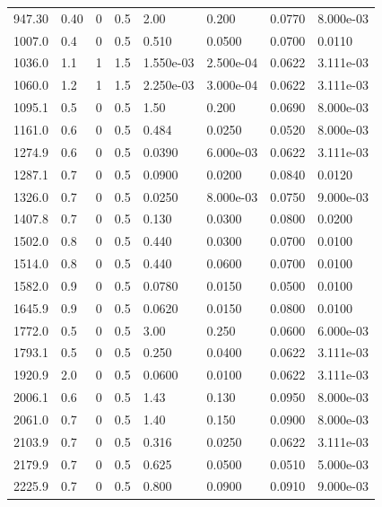 \documentclass[preview]{standalone}
\begin{document}
{{\begin{tabular}{L{1.2cm}C{1.2cm} C{0.3cm}C{0.5cm} C{1.4cm}C{1.4cm} C{1.4cm}C{1.4cm}}
  947.30  &  0.40  & 0     & 0.5 &  2.00  & 0.200  & 0.0770 &  8.000e-03   \\ 
  1007.0  &   0.4  & 0     & 0.5 &  0.510  & 0.0500  & 0.0700 &  0.0110   \\ 
  1036.0  &   1.1  & 1     & 1.5 &  1.550e-03  & 2.500e-04  & 0.0622 &  3.111e-03   \\ 
  1060.0  &   1.2  & 1     & 1.5 &  2.250e-03  & 3.000e-04  & 0.0622 &  3.111e-03   \\ 
  1095.1  &   0.5  & 0     & 0.5 &  1.50  & 0.200  & 0.0690 &  8.000e-03   \\ 
  1161.0  &   0.6  & 0     & 0.5 &  0.484  & 0.0250  & 0.0520 &  8.000e-03   \\ 
  1274.9  &   0.6  & 0     & 0.5 &  0.0390  & 6.000e-03  & 0.0622 &  3.111e-03   \\ 
  1287.1  &   0.7  & 0     & 0.5 &  0.0900  & 0.0200  & 0.0840 &  0.0120   \\ 
  1326.0  &   0.7  & 0     & 0.5 &  0.0250  & 8.000e-03  & 0.0750 &  9.000e-03   \\ 
  1407.8  &   0.7  & 0     & 0.5 &  0.130  & 0.0300  & 0.0800 &  0.0200   \\ 
  1502.0  &   0.8  & 0     & 0.5 &  0.440  & 0.0300  & 0.0700 &  0.0100   \\ 
  1514.0  &   0.8  & 0     & 0.5 &  0.440  & 0.0600  & 0.0700 &  0.0100   \\ 
  1582.0  &   0.9  & 0     & 0.5 &  0.0780  & 0.0150  & 0.0500 &  0.0100   \\ 
  1645.9  &   0.9  & 0     & 0.5 &  0.0620  & 0.0150  & 0.0800 &  0.0100   \\ 
  1772.0  &   0.5  & 0     & 0.5 &  3.00  & 0.250  & 0.0600 &  6.000e-03   \\ 
  1793.1  &   0.5  & 0     & 0.5 &  0.250  & 0.0400  & 0.0622 &  3.111e-03   \\ 
  1920.9  &   2.0  & 0     & 0.5 &  0.0600  & 0.0100  & 0.0622 &  3.111e-03   \\ 
  2006.1  &   0.6  & 0     & 0.5 &  1.43  & 0.130  & 0.0950 &  8.000e-03   \\ 
  2061.0  &   0.7  & 0     & 0.5 &  1.40  & 0.150  & 0.0900 &  8.000e-03   \\ 
  2103.9  &   0.7  & 0     & 0.5 &  0.316  & 0.0250  & 0.0622 &  3.111e-03   \\ 
  2179.9  &   0.7  & 0     & 0.5 &  0.625  & 0.0500  & 0.0510 &  5.000e-03   \\ 
  2225.9  &   0.7  & 0     & 0.5 &  0.800  & 0.0900  & 0.0910 &  9.000e-03   \\ 

\end{tabular}}}
\end{document}
